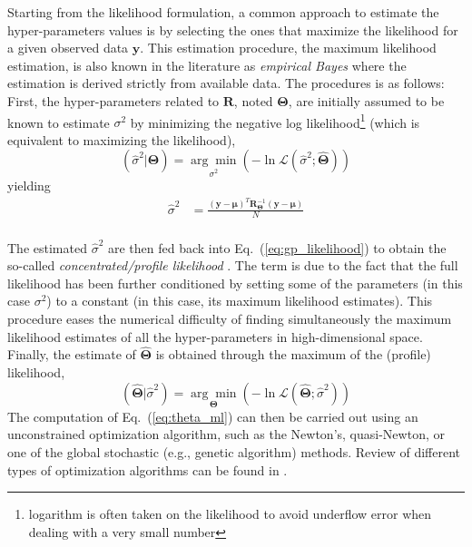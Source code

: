 Starting from the likelihood formulation, a common approach to estimate the hyper-parameters values is by selecting the ones that maximize the likelihood for a given observed data $\mathbf{y}$.
This estimation procedure, the maximum likelihood estimation, is also known in the literature as \emph{empirical Bayes} \cite{Koehler1996} where the estimation is derived strictly from available data.
The procedures is as follows:
First, the hyper-parameters related to $\mathbf{R}$, noted $\boldsymbol{\Theta}$, are initially assumed to be known to estimate $\sigma^2$ by minimizing the negative log likelihood\footnote{logarithm is often taken on the likelihood to avoid underflow error when dealing with a very small number} (which is equivalent to maximizing the likelihood),
\begin{equation}
	\left(\hat{\sigma}^2 | \boldsymbol{\Theta}\right) = \underset{\sigma^2}{\arg\min} \left(- \ln \mathcal{L} (\hat{\sigma}^2 ; \hat{\boldsymbol{\Theta}})\right)
\label{eq:concentrated_likelihood_1}
\end{equation} 
yielding
\begin{equation}
	\begin{split}
		\hat{\sigma}^2           & = \frac{(\mathbf{y} - \boldsymbol{\mu})^T \mathbf{R}_{\boldsymbol{\Theta}}^{-1} (\mathbf{y} - \boldsymbol{\mu})}{N}\\
	\end{split}
\label{eq:sigma_ml}
\end{equation}

The estimated $\hat{\sigma}^2$ are then fed back into Eq.~(\ref{eq:gp_likelihood}) to obtain the so-called \emph{concentrated/profile likelihood} \cite{Cole2013,Kreutz2013}.
The term is due to the fact that the full likelihood has been further conditioned by setting some of the parameters 
(in this case $\sigma^2$) to a constant (in this case, its maximum likelihood estimates).
This procedure eases the numerical difficulty of finding simultaneously the maximum likelihood estimates of all the hyper-parameters in high-dimensional space.
Finally, the estimate of $\hat{\boldsymbol{\Theta}}$ is obtained through the maximum of the (profile) likelihood,
\begin{equation}
	\left(\hat{\boldsymbol{\Theta}} | \hat{\sigma}^2\right) = \underset{\boldsymbol{\Theta}}{\arg\min} \left(- \ln \mathcal{L} (\hat{\boldsymbol{\Theta}};\hat{\sigma}^2)\right)
	\label{eq:theta_ml}
\end{equation}
The computation of Eq.~(\ref{eq:theta_ml}) can then be carried out using an unconstrained optimization algorithm, 
such as the Newton's, quasi-Newton, or one of the global stochastic (e.g., genetic algorithm) methods.
Review of different types of optimization algorithms can be found in \cite{Venter2010}.

